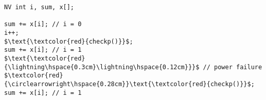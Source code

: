 \documentclass[border={20pt 5pt 10pt 10pt}]{standalone} %
\begin{document}
\begin{lstlisting}[style=mystyle, linewidth=115px]
NV int i, sum, x[];

sum += x[i]; // i = 0
i++;
$\text{\textcolor{red}{checkp()}}$;
sum += x[i]; // i = 1
$\text{\textcolor{red}{\lightning\hspace{0.3cm}\lightning\hspace{0.12cm}}}$ // power failure
$\textcolor{red}{\circlearrowright\hspace{0.28cm}}\text{\textcolor{red}{checkp()}}$;
sum += x[i]; // i = 1
\end{lstlisting}
\end{document}
